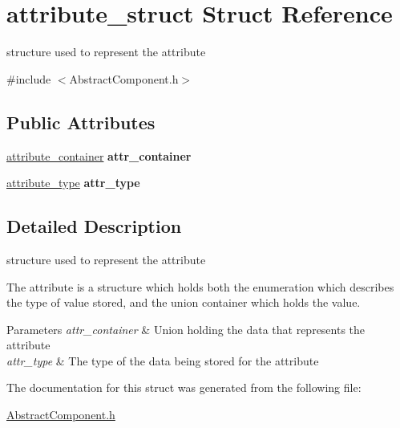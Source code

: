 \hypertarget{structattribute__struct}{\section{attribute\-\_\-struct Struct Reference}
\label{db/d65/structattribute__struct}
}


structure used to represent the attribute  




{\ttfamily \#include $<$Abstract\-Component.\-h$>$}

\subsection*{Public Attributes}
\begin{DoxyCompactItemize}
\item 
\hypertarget{structattribute__struct_ad02f949f2c509acec55c704f5ad5624b}{\hyperlink{_abstract_component_8h_a5ea0c69d6d8d1c92894095de560a634b}{attribute\-\_\-container} {\bfseries attr\-\_\-container}}\label{db/d65/structattribute__struct_ad02f949f2c509acec55c704f5ad5624b}

\item 
\hypertarget{structattribute__struct_a13c7977f036e903b08a6c20d2413ae08}{\hyperlink{_abstract_component_8h_a7d090069888e2837cee65351f2e86d73}{attribute\-\_\-type} {\bfseries attr\-\_\-type}}\label{db/d65/structattribute__struct_a13c7977f036e903b08a6c20d2413ae08}

\end{DoxyCompactItemize}


\subsection{Detailed Description}
structure used to represent the attribute 

The attribute is a structure which holds both the enumeration which describes the type of value stored, and the union container which holds the value.


\begin{DoxyParams}{Parameters}
{\em attr\-\_\-container} & Union holding the data that represents the attribute \\
\hline
{\em attr\-\_\-type} & The type of the data being stored for the attribute \\
\hline
\end{DoxyParams}


The documentation for this struct was generated from the following file\-:\begin{DoxyCompactItemize}
\item 
\hyperlink{_abstract_component_8h}{Abstract\-Component.\-h}\end{DoxyCompactItemize}
